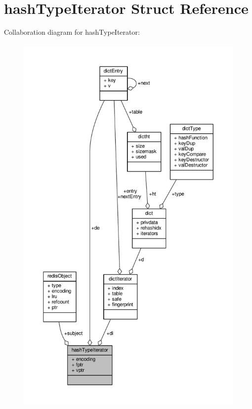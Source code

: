 \hypertarget{structhashTypeIterator}{}\section{hash\+Type\+Iterator Struct Reference}
\label{structhashTypeIterator}


Collaboration diagram for hash\+Type\+Iterator\+:\nopagebreak
\begin{figure}[H]
\begin{center}
\leavevmode
\includegraphics[height=550pt]{structhashTypeIterator__coll__graph}
\end{center}
\end{figure}
